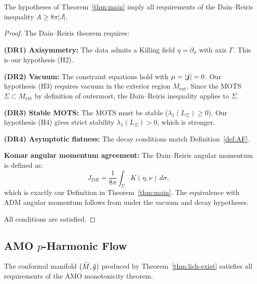 \begin{proposition}\label{prop:dainreiris-compat}
The hypotheses of Theorem~\ref{thm:main} imply all requirements of the Dain--Reiris inequality $A \geq 8\pi|J|$.
\end{proposition}

\begin{proof}
The Dain--Reiris theorem requires:

\textbf{(DR1) Axisymmetry:} The data admits a Killing field $\eta = \partial_\phi$ with axis $\Gamma$. This is our hypothesis (H2).

\textbf{(DR2) Vacuum:} The constraint equations hold with $\mu = |\boldsymbol{j}| = 0$. Our hypothesis (H3) requires vacuum in the exterior region $M_{\mathrm{ext}}$. Since the MOTS $\Sigma \subset M_{\mathrm{ext}}$ by definition of outermost, the Dain--Reiris inequality applies to $\Sigma$.

\textbf{(DR3) Stable MOTS:} The MOTS must be stable ($\lambda_1(L_\Sigma) \geq 0$). Our hypothesis (H4) gives strict stability $\lambda_1(L_\Sigma) > 0$, which is stronger.

\textbf{(DR4) Asymptotic flatness:} The decay conditions match Definition~\ref{def:AF}.

\textbf{Komar angular momentum agreement:} The Dain--Reiris angular momentum is defined as:
\[
J_{DR} = \frac{1}{8\pi}\int_\Sigma K(\eta, \nu)\,d\sigma,
\]
which is exactly our Definition in Theorem~\ref{thm:main}. The equivalence with ADM angular momentum follows from \cite[Proposition~2.3]{chrusciel2008} under the vacuum and decay hypotheses.

All conditions are satisfied. \qedhere
\end{proof}

\subsection{AMO \texorpdfstring{$p$}{p}-Harmonic Flow}

\begin{proposition}\label{prop:amo-compat}
The conformal manifold $(\tilde{M}, \tilde{g})$ produced by Theorem~\ref{thm:lich-exist} satisfies all requirements of the AMO monotonicity theorem.
\end{proposition}


